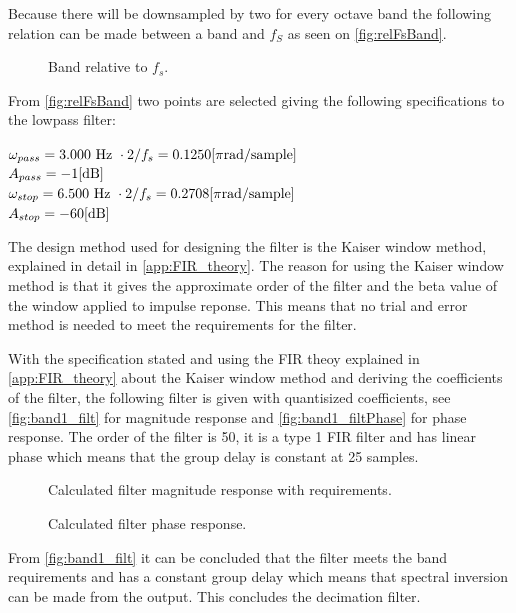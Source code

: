 Because there will be downsampled by two for every octave band the following relation can be made between a band and $f_S$ as seen on \autoref{fig:relFsBand}.
\begin{figure}[H]
	\centering
	
	\caption{Band relative to $f_s$.}
	\label{fig:relFsBand}
\end{figure}

From \autoref{fig:relFsBand} two points are selected giving the following specifications to the lowpass filter:

$\omega_{pass}=3.000\textrm{ Hz }\cdot 2/f_s=0.1250 \enhed{\pi rad/sample}$\\
$A_{pass}=-1 \enhed{dB}$\\
$\omega_{stop}=6.500\textrm{ Hz }\cdot 2/f_s=0.2708 \enhed{\pi rad/sample}$\\
$A_{stop}=-60 \enhed{dB}$

The design method used for designing the filter is the Kaiser window method, explained in detail in \autoref{app:FIR_theory}. The reason for using the Kaiser window method is that it gives the approximate order of the filter and the beta value of the window applied to impulse reponse. This means that no trial and error method is needed to meet the requirements for the filter.

With the specification stated and using the FIR theoy explained in \autoref{app:FIR_theory} about the Kaiser window method and deriving the coefficients of the filter, the following filter is given with quantisized coefficients, see \autoref{fig:band1_filt} for magnitude response and \autoref{fig:band1_filtPhase} for phase response. The order of the filter is 50, it is a type 1 FIR filter and has linear phase which means that the group delay is constant at 25 samples.  

\begin{figure}[H]
\centering
	
	\caption{Calculated filter magnitude response with requirements.}
	\label{fig:band1_filt}
\end{figure}
\begin{figure}[H]
\centering
	
	\caption{Calculated filter phase response.}
	\label{fig:band1_filtPhase}
\end{figure}

From \autoref{fig:band1_filt} it can be concluded that the filter meets the band requirements and has a constant group delay which means that spectral inversion can be made from the output. This concludes the decimation filter. 

